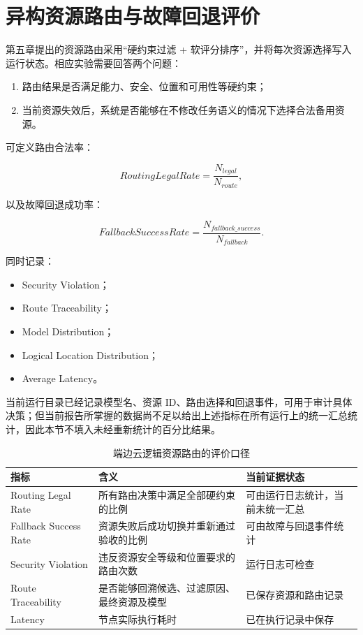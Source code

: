 \documentclass[UTF8,a4paper,12pt,oneside]{ctexbook}
\begin{document}
\section{异构资源路由与故障回退评价}

第五章提出的资源路由采用“硬约束过滤 + 软评分排序”，并将每次资源选择写入运行状态。相应实验需要回答两个问题：

\begin{enumerate}
    \item 路由结果是否满足能力、安全、位置和可用性等硬约束；
    \item 当前资源失效后，系统是否能够在不修改任务语义的情况下选择合法备用资源。
\end{enumerate}

可定义路由合法率：

\[
RoutingLegalRate
=
\frac{N_{legal}}{N_{route}},
\]

以及故障回退成功率：

\[
FallbackSuccessRate
=
\frac{N_{fallback\_success}}{N_{fallback}}.
\]

同时记录：

\begin{itemize}
    \item Security Violation；
    \item Route Traceability；
    \item Model Distribution；
    \item Logical Location Distribution；
    \item Average Latency。
\end{itemize}

当前运行目录已经记录模型名、资源 ID、路由选择和回退事件，可用于审计具体决策；但当前报告所掌握的数据尚不足以给出上述指标在所有运行上的统一汇总统计，因此本节不填入未经重新统计的百分比结果。

\begin{table}[htbp]
\centering
\caption{端边云逻辑资源路由的评价口径}
\label{tab:routing-evaluation}
\begin{tabularx}{0.96\textwidth}{p{}X p{}}
\toprule
指标 & 含义 & 当前证据状态\\
\midrule

Routing Legal Rate
& 所有路由决策中满足全部硬约束的比例
& 可由运行日志统计，当前未统一汇总\\

Fallback Success Rate
& 资源失败后成功切换并重新通过验收的比例
& 可由故障与回退事件统计\\

Security Violation
& 违反资源安全等级和位置要求的路由次数
& 运行日志可检查\\

Route Traceability
& 是否能够回溯候选、过滤原因、最终资源及模型
& 已保存资源和路由记录\\

Latency
& 节点实际执行耗时
& 已在执行记录中保存\\

\bottomrule
\end{tabularx}
\end{table}
\end{document}
